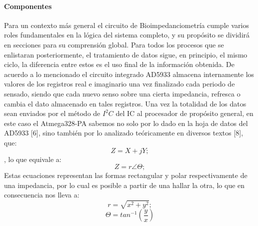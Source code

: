 \documentclass[12pt,letterpaper,spanish]{article}
\begin{document}
				\paragraph{Componentes}
				\hfill\break
Para un contexto más general el circuito de Bioimpedanciometría cumple varios roles fundamentales en la lógica del sistema completo,  y su propósito se dividirá en secciones  para su comprensión global.
Para todos los procesos que se enlistaran posteriormente, el tratamiento de datos sigue, en principio, el mismo ciclo, la diferencia entre estos es el uso final de la información obtenida.
De acuerdo a lo mencionado el circuito integrado AD5933 almacena internamente los valores de los registros real e imaginario una vez finalizado cada periodo de sensado, siendo que cada nuevo senso sobre una cierta impedancia, refresca o cambia el dato almacenado en tales registros.
Una vez la totalidad de los datos sean enviados por el método de $I^{2}C$  del IC al procesador de propósito general, en este caso el Atmega328-PA sabemos no solo por lo dado en la hoja de datos del AD5933 [6], sino también por lo analizado teóricamente en diversos textos [8], que:
$$Z = X+jY;$$, lo que equivale a:  $$Z=r\angle\Theta;$$
Estas ecuaciones representan las formas rectangular y polar respectivamente de una impedancia, por lo cual es posible a partir de una hallar la otra, lo que en consecuencia nos lleva a:
$$r = \sqrt{x^{2}+y^{2}};$$ $$\Theta = tan^{-1}(\dfrac{y}{x})  $$								
			
\end{document}
